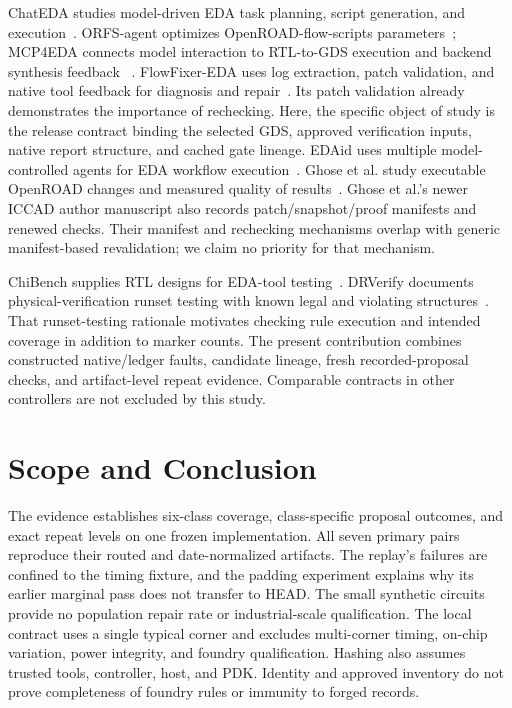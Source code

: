 \documentclass[runningheads]{llncs}
\begin{document}
ChatEDA studies model-driven EDA task
planning, script generation, and execution~\cite{chateda}. ORFS-agent
optimizes OpenROAD-flow-scripts parameters~\cite{orfsagent}; MCP4EDA connects
model interaction to RTL-to-GDS execution and backend synthesis feedback
~\cite{mcp4eda}. FlowFixer-EDA uses log extraction, patch validation, and
native tool feedback for diagnosis and repair~\cite{flowfixer}. Its patch
validation already demonstrates the importance of rechecking. Here, the
specific object of study is the release contract binding the selected GDS,
approved verification inputs, native report structure, and cached gate lineage.
EDAid uses
multiple model-controlled agents for EDA workflow execution~\cite{edaid}.
Ghose et al. study executable OpenROAD changes and measured quality of
results~\cite{audopeda}. Ghose et al.'s newer ICCAD author manuscript also
records patch/snapshot/proof manifests and renewed checks. Their manifest
and rechecking mechanisms overlap with generic manifest-based revalidation;
we claim no priority for that mechanism.

ChiBench supplies RTL designs for EDA-tool testing~\cite{chibench}.
DRVerify documents physical-verification runset testing with known legal
and violating structures~\cite{drverify}. That runset-testing rationale motivates checking rule execution and intended
coverage in addition to marker counts. The
present contribution combines constructed native/ledger faults, candidate
lineage, fresh recorded-proposal checks, and artifact-level repeat evidence.
Comparable contracts in other controllers are not excluded by this study.

\section{Scope and Conclusion}
The evidence establishes six-class coverage, class-specific proposal
outcomes, and exact repeat levels on one frozen implementation. All seven
primary pairs reproduce their routed and date-normalized artifacts. The
replay's failures are confined to the timing fixture, and the padding
experiment explains why its earlier marginal pass does not transfer to HEAD.
The small synthetic circuits provide no population repair rate or
industrial-scale qualification. The local contract uses a single typical corner and excludes
multi-corner timing, on-chip variation, power integrity, and foundry
qualification. Hashing also assumes trusted tools, controller, host, and
PDK. Identity and approved inventory do not prove completeness of foundry
rules or immunity to forged records.
\end{document}
